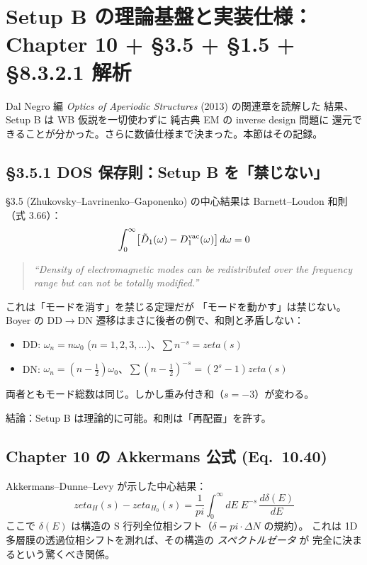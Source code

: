\documentclass[11pt,a4paper]{article}
\def\pi{pi}%
\def\zeta{zeta}%
\def\textbf#1{#1}%
\begin{document}
\section{Setup B の理論基盤と実装仕様：Chapter 10 + §3.5 + §1.5 + §8.3.2.1 解析}

Dal Negro 編 \emph{Optics of Aperiodic Structures} (2013) の関連章を読解した
結果、Setup B は \textbf{WB 仮説を一切使わずに} 純古典 EM の inverse design 問題に
還元できることが分かった。さらに数値仕様まで決まった。本節はその記録。

\subsection{§3.5.1 DOS 保存則：Setup B を「禁じない」}

§3.5 (Zhukovsky--Lavrinenko--Gaponenko) の中心結果は Barnett--Loudon 和則
（式 3.66）：
\[
  \int_0^\infty \bigl[\tilde D_1(\omega) - D_1^{\rm vac}(\omega)\bigr]\,d\omega = 0
\]
\begin{quote}\itshape
``Density of electromagnetic modes can be \textbf{redistributed} over the
frequency range but \textbf{can not be totally modified}.''
\end{quote}

これは「モードを消す」を禁じる定理だが \textbf{「モードを動かす」は禁じない}。
Boyer の DD$\to$DN 遷移はまさに後者の例で、和則と矛盾しない：
\begin{itemize}
\item DD: $\omega_n = n\omega_0$ ($n=1,2,3,\ldots$)、$\sum n^{-s} = \zeta(s)$
\item DN: $\omega_n = (n-\tfrac12)\omega_0$、$\sum(n-\tfrac12)^{-s} = (2^s-1)\zeta(s)$
\end{itemize}
両者ともモード総数は同じ。しかし重み付き和（$s=-3$）が変わる。

\begin{tcolorbox}[colback=yellow!5,colframe=orange!60!black]
\textbf{結論}：Setup B は理論的に可能。和則は「再配置」を許す。
\end{tcolorbox}

\subsection{Chapter 10 の Akkermans 公式 (Eq.\ 10.40)}

Akkermans--Dunne--Levy が示した中心結果：
\[
  \zeta_H(s) - \zeta_{H_0}(s) = \frac{1}{\pi}\int_0^\infty dE\;E^{-s}\,\frac{d\delta(E)}{dE}
\]
ここで $\delta(E)$ は構造の S 行列全位相シフト（$\delta = \pi \cdot \Delta N$ の規約）。
これは \textbf{1D 多層膜の透過位相シフトを測れば、その構造の \emph{スペクトルゼータ} が
完全に決まる}という驚くべき関係。
\end{document}
